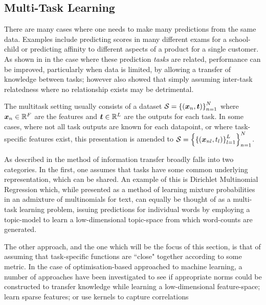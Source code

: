 

\subsection{Multi-Task Learning}

There are many cases where one needs to make many predictions from the same data. Examples include predicting scores in many different exams for a school-child\cite{Bonilla2008}\cite{Evgeniou2005} or predicting affinity to different aspects of a product for a single customer\cite{Allenby1999}. As shown in \cite{Caruana1997} in the case where these prediction \emph{tasks} are related, performance can be improved, particularly when data is limited, by allowing a transfer of knowledge between tasks; however \cite{Caruana1997} also showed that simply assuming inter-task relatedness where no relationship exists may be detrimental.

The multitask setting usually consists of a dataset $\mathcal{S} = \left\{\left(\bm x_n, \bm t\right)\right\}_{n=1}^N$ where $\bm x_n \in { \mathbb{R}^{F} }$ are the features and $\bm t \in { \mathbb{R}^{L} }$ are the outputs for each task. In some cases, where not all task outputs are known for each datapoint, or where task-specific features exist, this presentation is amended to $\mathcal{S} = \left\{\left\{\left(\bm x_{nl}, t_l\right)\right\}_{l=1}^L\right\}_{n=1}^N$. 

As described in\cite{Argyriou2005} the method of information transfer broadly falls into two categories. In the first, one assumes that tasks have some common underlying representation, which can be shared\cite{Caruana1997}. An example of this is Dirichlet Multinomial Regression\cite{Mimno2008} which, while presented as a method of learning mixture probabilities in an admixture of multinomials for text, can equally be thought of as a multi-task learning problem, issuing predictions for individual words by employing a topic-model to learn a low-dimensional topic-space from which word-counts are generated. 

The other approach, and the one which will be the focus of this section, is that of assuming that task-specific functions are ``close" together according to some metric. In the case of optimisation-based approached to machine learning, a number of approaches have been investigated to see if appropriate norms could be constructed to transfer knowledge while learning a low-dimensional feature-space\cite{argyriou2007spectral}; learn sparse features\cite{Argyriou2005}; or use kernels to capture correlations\cite{Evgeniou2005}


